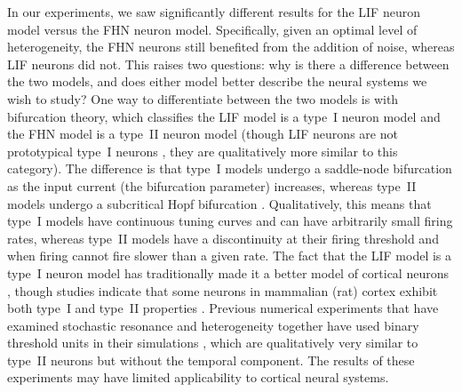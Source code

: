 \documentclass[12pt]{article}
\begin{document}
In our experiments, we saw significantly different results for the LIF neuron model versus the FHN neuron model. Specifically, given an optimal level of heterogeneity, the FHN neurons still benefited from the addition of noise, whereas LIF neurons did not. This raises two questions: why is there a difference between the two models, and does either model better describe the neural systems we wish to study? One way to differentiate between the two models is with bifurcation theory, which classifies the LIF model is a type~I neuron model and the FHN model is a type~II neuron model (though LIF neurons are not prototypical type~I neurons \citep{Mato2008}, they are qualitatively more similar to this category). The difference is that type~I models undergo a saddle-node bifurcation as the input current (the bifurcation parameter) increases, whereas type~II models undergo a subcritical Hopf bifurcation \citep{Mato2008}. Qualitatively, this means that type~I models have continuous tuning curves and can have arbitrarily small firing rates, whereas type~II models have a discontinuity at their firing threshold and when firing cannot fire slower than a given rate. The fact that the LIF model is a type~I neuron model has traditionally made it a better model of cortical neurons \citep{Koch1999}, though studies indicate that some neurons in mammalian (rat) cortex exhibit both type~I and type~II properties \citep{Tateno2004,Tsubo2007}. Previous numerical experiments that have examined stochastic resonance and heterogeneity together have used binary threshold units in their simulations \citep{Stocks2000,McDonnell2006}, which are qualitatively very similar to type~II neurons but without the temporal component. The results of these experiments may have limited applicability to cortical neural systems.
\end{document}
